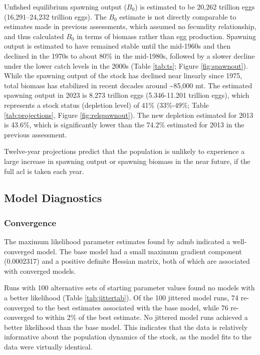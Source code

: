 \documentclass[11pt,
  english,
  letterpaper,
]{article}
\begin{document}
Unfished equilibrium spawning output (\(B_0\)) is estimated to be 20,262 trillion eggs (16,291--24,232 trillion eggs). The \(B_0\) estimate is not directly comparable to estimates made in previous assessments, which assumed no fecundity relationship, and thus calculated \(B_0\) in terms of biomass rather than egg production. Spawning output is estimated to have remained stable until the mid-1960s and then declined in the 1970s to about 80\% in the mid-1980s, followed by a slower decline under the lower catch levels in the 2000s (Table \ref{tab:ts}; Figure \ref{fig:spawnout}). While the spawning output of the stock has declined near linearly since 1975, total biomass has stabilized in recent decades around \textasciitilde85,000 mt. The estimated spawning output in 2023 is 8.273 trillion eggs (5.346-11.201 trillion eggs), which represents a stock status (depletion level) of 41\% (33\%-49\%; Table \ref{tab:projections}, Figure \ref{fig:relspawnout}). The new depletion estimated for 2013 is 43.6\%, which is significantly lower than the 74.2\% estimated for 2013 in the previous assessment.

Twelve-year projections predict that the population is unlikely to experience a large increase in spawning output or spawning biomass in the near future, if the full \gls{acl} is taken each year.

\hypertarget{model-diagnostics}{%
\subsection{Model Diagnostics}\label{model-diagnostics}}

\hypertarget{convergence}{%
\subsubsection{Convergence}\label{convergence}}

The maximum likelihood parameter estimates found by \gls{admb} indicated a well-converged model. The base model had a small maximum gradient component (0.0002317) and a positive definite Hessian matrix, both of which are associated with converged models.

Runs with 100 alternative sets of starting parameter values found no models with a better likelihood (Table \ref{tab:jittertab}). Of the 100 jittered model runs, 74 re-converged to the best estimates associated with the base model, while 76 re-converged to within 2\% of the best estimate. No jittered model runs achieved a better likelihood than the base model. This indicates that the data is relatively informative about the population dynamics of the stock, as the model fits to the data were virtually identical.
\end{document}

